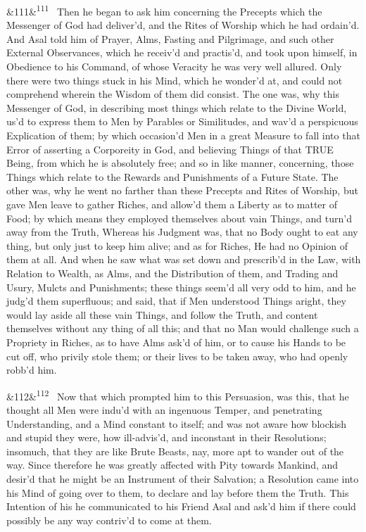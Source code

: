 \documentclass[12pt]{article}
\newcommand{\para}[1][]{\par\noindent\ifx&#1&\else\textsuperscript{\footnotesize #1}~\fi}
\begin{document}
\para[111] Then he began to ask him concerning the Precepts which the Messenger of God had deliver'd, and the Rites of Worship which he had ordain'd. And Asal told him of Prayer, Alms, Fasting and Pilgrimage, and such other External Observances, which he receiv'd and practis'd, and took upon himself, in Obedience to his Command, of whose Veracity he was very well allured. Only there were two things stuck in his Mind, which he wonder'd at, and could not comprehend wherein the Wisdom of them did consist. The one was, why this Messenger of God, in describing most things which relate to the Divine World, us'd to express them to Men by Parables or Similitudes, and wav'd a perspicuous Explication of them; by which occasion'd Men in a great Measure to fall into that Error of asserting a Corporeity in God, and believing Things of that TRUE Being, from which he is absolutely free; and so in like manner, concerning, those Things which relate to the Rewards and Punishments of a Future State. The other was, why he went no farther than these Precepts and Rites of Worship, but gave Men leave to gather Riches, and allow'd them a Liberty as to matter of Food; by which means they employed themselves about vain Things, and turn'd away from the Truth, Whereas his Judgment was, that no Body ought to eat any thing, but only just to keep him alive; and as for Riches, He had no Opinion of them at all. And when he saw what was set down and prescrib'd in the Law, with Relation to Wealth, as Alms, and the Distribution of them, and Trading and Usury, Mulcts and Punishments; these things seem'd all very odd to him, and he judg'd them superfluous; and said, that if Men understood Things aright, they would lay aside all these vain Things, and follow the Truth, and content themselves without any thing of all this; and that no Man would challenge such a Propriety in Riches, as to have Alms ask'd of him, or to cause his Hands to be cut off, who privily stole them; or their lives to be taken away, who had openly robb'd him.

\para[112] Now that which prompted him to this Persuasion, was this, that he thought all Men were indu'd with an ingenuous Temper, and penetrating Understanding, and a Mind constant to itself; and was not aware how blockish and stupid they were, how ill-advis'd, and inconstant in their Resolutions; insomuch, that they are like Brute Beasts, nay, more apt to wander out of the way. Since therefore he was greatly affected with Pity towards Mankind, and desir'd that he might be an Instrument of their Salvation; a Resolution came into his Mind of going over to them, to declare and lay before them the Truth. This Intention of his he communicated to his Friend Asal and ask'd him if there could possibly be any way contriv'd to come at them.
\end{document}
